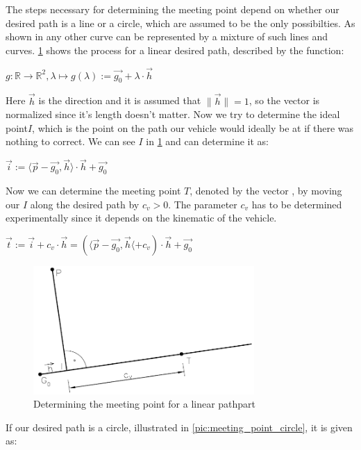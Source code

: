The steps necessary for determining the meeting point depend on whether our desired path is a line or a circle, which are assumed to be the only possibilties. As shown in \cite{12} any other curve can be represented by a mixture of such lines and curves.
\ref{pic:meeting_point_linear} shows the process for a linear desired path, described by the function:
\begin{center}
$g:\mathbb{R} \to \mathbb{R}^2 , \lambda \mapsto g(\lambda ) := \vec{g_0} + \lambda \cdot \vec{h}$
\end{center}
Here $\vec{h}$ is the direction and it is assumed that $\|\vec{h}\|=1$, so the vector is normalized since it's length doesn't matter. Now we try to determine the ideal point$I$, which is the point on the path our vehicle would ideally be at if there was nothing to correct. We can see $I$ in \ref{pic:meeting_point_linear} and can determine it as:
\begin{center}
$\vec{i}:= \langle \vec{p}-\vec{g_0}, \vec{h} \rangle \cdot \vec{h} + \vec{g_0}$
\end{center}
Now we can determine the meeting point $T$, denoted by the vector , by moving our $I$ along the desired path by $c_v>0$. The parameter $c_v$ has to be determined experimentally since it depends on the kinematic of the vehicle.
\begin{center}
$\vec{t}:=\vec{i}+c_v \cdot \vec{h} = ( \langle \vec{p} - \vec{g_0}, \vec{h} \langle + c_v) \cdot \vec{h} + \vec{g_0}$
\end{center}

\begin{figure}[h]
\centering
\includegraphics[width=0.75\textwidth]{./Chapters/Figures/meeting_point_linear.png}
\caption{Determining the meeting point for a linear pathpart\label{pic:meeting_point_linear}}
\end{figure}

If our desired path is a circle, illustrated in \ref{pic:meeting_point_circle}, it is given as:


